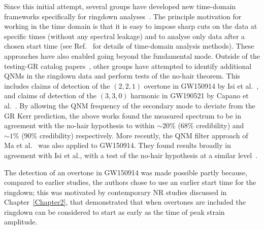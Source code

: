 Since this initial attempt, several groups have developed new time-domain frameworks specifically for ringdown analyses~\cite{Carullo:2019flw, Isi:2019aib, Capano:2021etf}.
The principle motivation for working in the time domain is that it is easy to impose sharp cuts on the data at specific times (without any spectral leakage) and to analyse only data after a chosen start time (see Ref.~\cite{Isi:2021iql} for details of time-domain analysis methods).
These approaches have also enabled going beyond the fundamental mode. 
Outside of the testing-GR catalog papers~\cite{LIGOScientific:2020tif, LIGOScientific:2021sio}, other groups have attempted to identify additional QNMs in the ringdown data and perform tests of the no-hair theorem. 
This includes claims of detection of the $(2,2,1)$ overtone in GW150914 by Isi et al.~\cite{Isi:2019aib}, and claims of detection of the $(3,3,0)$ harmonic in GW190521 by Capano et al.~\cite{Capano:2021etf}. 
By allowing the QNM frequency of the secondary mode to deviate from the GR Kerr prediction, the above works found the measured spectrum to be in agreement with the no-hair hypothesis to within $\sim 20\%$ ($68\%$ credibility) and $\sim 1\%$ ($90\%$ credibility) respectively.
More recently, the QNM filter approach of Ma et al.~\cite{Ma:2022wpv} was also applied to GW150914.
They found results broadly in agreement with Isi et al., with a test of the no-hair hypothesis at a similar level~\cite{Ma:2023vvr, Ma:2023cwe}.

The detection of an overtone in GW150914 was made possible partly because, compared to earlier studies, the authors chose to use an earlier start time for the ringdown; this was motivated by contemporary NR studies discussed in Chapter~\ref{Chapter2}, that demonstrated that when overtones are included the ringdown can be considered to start as early as the time of peak strain amplitude. 

